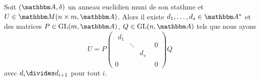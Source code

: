 \begin{proposition}   \label{PropPDfCqee}
    Soit \( (\eA,\delta)\) un anneau euclidien muni de son stathme  et \( U\in \eM(n \times m,\eA)\). Alors il existe \( d_1,\ldots, d_s\in \eA^*\) et des matrices \( P\in\GL(m,\eA)\), \( Q\in \GL(n,\eA)\) tels que nous ayons
    \begin{equation}
        U=P \begin{pmatrix}
            \begin{matrix}
                d_1    &       &       \\
                    &   \ddots    &       \\
                    &       &   d_s
            \end{matrix}&   0    \\
            0    &   0
        \end{pmatrix}Q
    \end{equation}
    avec \( d_i\divides d_{i+1}\) pour tout \( i\).
\end{proposition}


